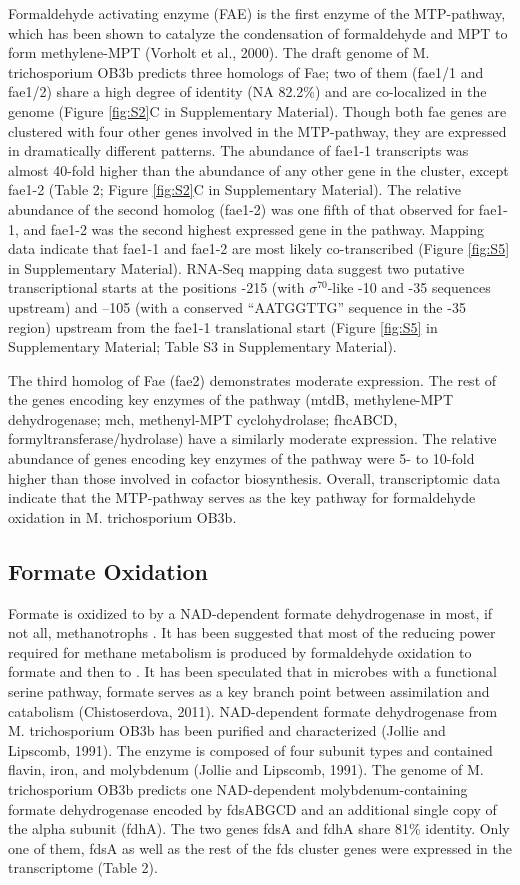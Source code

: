 Formaldehyde activating enzyme (FAE) is the first enzyme of the MTP-pathway, which has been shown to catalyze the condensation of formaldehyde and MPT to form methylene-MPT (Vorholt et al., 2000).
The draft genome of M. trichosporium OB3b predicts three homologs of Fae; two of them (fae1/1 and fae1/2) share a high degree of identity (NA 82.2\%) and are co-localized in the genome (Figure \ref{fig:S2}C in Supplementary Material).
Though both fae genes are clustered with four other genes involved in the MTP-pathway, they are expressed in dramatically different patterns.
The abundance of fae1-1 transcripts was almost 40-fold higher than the abundance of any other gene in the cluster, except fae1-2 (Table 2; Figure \ref{fig:S2}C in Supplementary Material).
The relative abundance of the second homolog (fae1-2) was one fifth of that observed for fae1-1, and fae1-2 was the second highest expressed gene in the pathway.
Mapping data indicate that fae1-1 and fae1-2 are most likely co-transcribed (Figure \ref{fig:S5} in Supplementary Material).
RNA-Seq mapping data suggest two putative transcriptional starts at the positions -215 (with $\sigma^{70}$-like -10 and -35 sequences upstream) and –105 (with a conserved “AATGGTTG” sequence in the -35 region) upstream from the fae1-1 translational start (Figure \ref{fig:S5} in Supplementary Material; Table S3 in Supplementary Material).

The third homolog of Fae (fae2) demonstrates moderate expression.
The rest of the genes encoding key enzymes of the pathway (mtdB, methylene-MPT dehydrogenase; mch, methenyl-MPT cyclohydrolase; fhcABCD, formyltransferase/hydrolase) have a similarly moderate expression.
The relative abundance of genes encoding key enzymes of the pathway were 5- to 10-fold higher than those involved in cofactor biosynthesis.
Overall, transcriptomic data indicate that the MTP-pathway serves as the key pathway for formaldehyde oxidation in M. trichosporium OB3b.

\subsection{Formate Oxidation}
Formate is oxidized to  by a NAD-dependent formate dehydrogenase in most, if not all, methanotrophs \cite{anthony1982}.
It has been suggested that most of the reducing power required for methane metabolism is produced by formaldehyde oxidation to formate and then to  \cite{hanson1996}.
It has been speculated that in microbes with a functional serine pathway, formate serves as a key branch point between assimilation and catabolism (Chistoserdova, 2011).
NAD-dependent formate dehydrogenase from M. trichosporium OB3b has been purified and characterized (Jollie and Lipscomb, 1991).
The enzyme is composed of four subunit types and contained flavin, iron, and molybdenum (Jollie and Lipscomb, 1991).
The genome of M. trichosporium OB3b predicts one NAD-dependent molybdenum-containing formate dehydrogenase encoded by fdsABGCD and an additional single copy of the alpha subunit (fdhA).
The two genes fdsA and fdhA share 81\% identity.
Only one of them, fdsA as well as the rest of the fds cluster genes were expressed in the transcriptome (Table 2).

